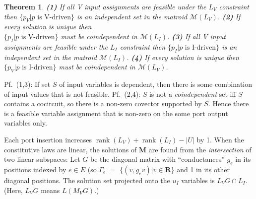 \documentclass{article}
\def\Reals{\ensuremath{\mathbf R}}
\newtheorem{theorem}{Theorem}
\DeclareMathOperator{\rank}{rank}
\begin{document}
\begin{theorem}
\label{Feasiblity1}
\textbf{(1)} If all V input assignments are feasible under
the $L_V$ constraint then 
$\{p_V|p \mbox{\ is V-driven}\}$
is an independent set in the matroid $\mathcal{M}(L_V)$.
\textbf{(2)} If every solution is unique then\\
$\{p_I|p \mbox{\ is V-driven}\}$
must be coindependent in $\mathcal{M}(L_I)$.
\textbf{(3)} 
If all V input assignments are feasible under
the $L_I$ constraint then 
$\{p_I|p \mbox{\ is I-driven}\}$
is an independent set in the matroid $\mathcal{M}(L_I)$.
\textbf{(4)} If every solution is unique 
then
$\{p_V|p \mbox{\ is I-driven}\}$
must be coindependent in $\mathcal{M}(L_V)$.
\end{theorem}

\noindent Pf.\ (1,3):
If set $S$ of input variables is dependent, then there is
some combination of input values that is not feasible.
Pf.\ (2,4):
$S$ is not a \textit{coindependent} set iff $S$ contains a cocircuit, so
there is a non-zero covector supported by $S$.  Hence there is a 
feasible variable assignment that is non-zero on the some port output
variables only.


Each port insertion increases $\rank(L_V)+\rank(L_I)-|U|$ by 1.
When the constitutive laws are linear, the solutions of $\textbf{M}$ are
found from the \textit{intersection} of two linear subspaces:  Let $G$ 
be the diagonal matrix with ``conductances'' $g_e$ in its positions
indexed by $e \in E$ (so $\Gamma_e$ $=$ $\{ (v, g_e v) | v \in \Reals \}$
and 1 in its other diagonal positions.  The solution set projected onto
the $u_I$ variables is $L_VG\cap L_I$.  
(Here, $L_V G$ means $L(M_V G)$.)


\begin{comment}
Familiar topological conditions on dependencies among source values
pertain to the \textit{matroids} of the subspaces $L_V$ and $L_I$.
Questions about existence and uniqueness of solution
will be answered in terms of supplementary subspace pair models
which are obtained by the familiar operations of opening and shorting ports.
Finally, operations on subspace pairs that model nullor insertion are
defined, so that such ideal elements can be modeled combinatorially or
geometrically.  

The supplemental subspace pair derived after nullor 
insertion will typically not be orthogonal.  One might also choose to
model linearized CCCSs or VCVSs within one of the subspaces.  
\end{comment}
\end{document}
